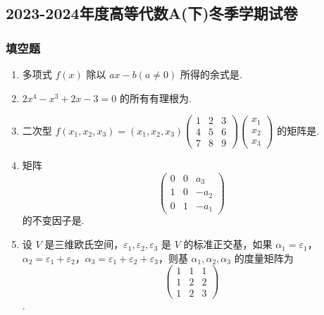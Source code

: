 \subsection{2023-2024年度高等代数A(下)冬季学期试卷}

\subsubsection*{填空题}

\begin{enumerate}
    \item 多项式 \(f(x)\) 除以 \(ax-b(a\neq 0)\) 所得的余式是\underline{\hspace{2cm}}.
    \item \(2x^{4}-x^{3}+2x-3=0\) 的所有有理根为\underline{\hspace{2cm}}.
    \item 二次型 \(f(x_{1},x_{2},x_{3})=(x_{1},x_{2},x_{3})\begin{pmatrix}1 & 2 & 3 \\ 4 & 5 & 6 \\ 7 & 8 & 9\end{pmatrix}\begin{pmatrix}x_{1} \\ x_{2} \\ x_{3}\end{pmatrix}\) 的矩阵是\underline{\hspace{2cm}}.
    \item 矩阵 \begin{equation*}\begin{pmatrix}0 & 0 & a_{3} \\ 1 & 0 & -a_{2} \\ 0 & 1 & -a_{1}\end{pmatrix}\end{equation*} 的不变因子是\underline{\hspace{2cm}}.
    \item 设 \(V\) 是三维欧氏空间，\(\varepsilon_{1},\varepsilon_{2},\varepsilon_{3}\) 是 \(V\) 的标准正交基，如果 \(\alpha_{1}=\varepsilon_{1}\)，\(\alpha_{2}=\varepsilon_{1}+\varepsilon_{2}\)，\(\alpha_{3}=\varepsilon_{1}+\varepsilon_{2}+\varepsilon_{3}\)，则基 \(\alpha_{1},\alpha_{2},\alpha_{3}\) 的度量矩阵为 \begin{equation*}\begin{pmatrix}1 & 1 & 1 \\ 1 & 2 & 2 \\ 1 & 2 & 3\end{pmatrix}\end{equation*}.
\end{enumerate}


